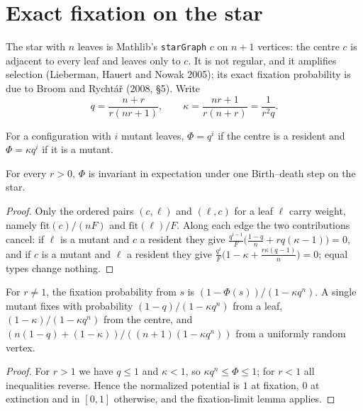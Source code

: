\section{Exact fixation on the star}\label{sec:broom-rychtar}
The star with $n$ leaves is Mathlib's \texttt{starGraph} $c$ on $n+1$ vertices: the centre $c$
is adjacent to every leaf and leaves only to $c$. It is not regular, and it amplifies selection
(Lieberman, Hauert and Nowak 2005); its exact fixation probability is due to Broom and
Rycht\'a\v{r} (2008, \S5). Write
\[ q=\frac{n+r}{r(nr+1)},\qquad \kappa=\frac{nr+1}{r(n+r)}=\frac1{r^2q}. \]
\begin{definition}\label{def:star-potential}
\leanok
For a configuration with $i$ mutant leaves, $\Phi=q^i$ if the centre is a resident and
$\Phi=\kappa q^i$ if it is a mutant.
\end{definition}
\begin{theorem}\label{thm:star-invariance}
\leanok{}
For every $r>0$, $\Phi$ is invariant in expectation under one Birth--death step on the star.
\end{theorem}
\begin{proof}\leanok
Only the ordered pairs $(c,\ell)$ and $(\ell,c)$ for a leaf $\ell$ carry weight, namely
$\mathrm{fit}(c)/(nF)$ and $\mathrm{fit}(\ell)/F$. Along each edge the two contributions cancel:
if $\ell$ is a mutant and $c$ a resident they give $\frac{q^{i-1}}F\big(\frac{1-q}n+rq(\kappa-1)\big)=0$,
and if $c$ is a mutant and $\ell$ a resident they give
$\frac{q^i}F\big(1-\kappa+\frac{r\kappa(q-1)}n\big)=0$; equal types change nothing.
\end{proof}
\begin{theorem}\label{thm:star}
\leanok{}
For $r\ne1$, the fixation probability from $s$ is $(1-\Phi(s))/(1-\kappa q^n)$. A single mutant
fixes with probability $(1-q)/(1-\kappa q^n)$ from a leaf, $(1-\kappa)/(1-\kappa q^n)$ from the
centre, and $(n(1-q)+(1-\kappa))/((n+1)(1-\kappa q^n))$ from a uniformly random vertex.
\end{theorem}
\begin{proof}\leanok
For $r>1$ we have $q\le1$ and $\kappa<1$, so $\kappa q^n\le\Phi\le1$; for $r<1$ all inequalities
reverse. Hence the normalized potential is $1$ at fixation, $0$ at extinction and in $[0,1]$
otherwise, and the fixation-limit lemma applies.
\end{proof}
